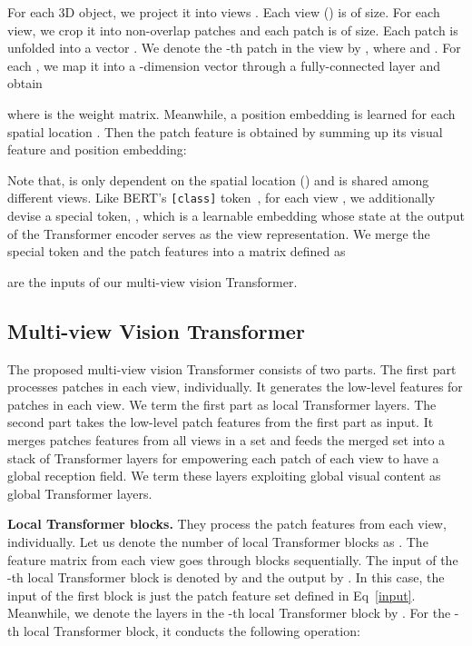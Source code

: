 \documentclass{bmvc2k}
\begin{document}
For each 3D object, we project it into  views . Each view  () is of   size. 
For each view, we crop it into  non-overlap patches and each patch is of  size. Each patch is unfolded into a vector . We denote  the -th patch in the view  by , where  and . 
For each , we map it into a -dimension vector through a fully-connected layer and obtain 

where  is the weight matrix.  Meanwhile,  a position embedding  is learned for each spatial location . Then the patch feature is obtained by summing up its visual feature and position embedding:

Note that,  is only dependent on the spatial location () and is shared among different views.
Like BERT's \texttt{[class]} token~\cite{devlin2019bert}, for each view , we additionally devise a special token, , which is a learnable embedding whose state at the output of the Transformer encoder serves as the view representation. We merge the special token  and  the patch features  into a matrix  defined as 

 are the inputs of our multi-view vision Transformer.

\vspace{-0.1in}
\subsection{Multi-view Vision Transformer}


The proposed multi-view vision Transformer consists of two parts. The first part 
processes patches in each view, individually. It generates the low-level features for patches in each view. We term the first part as local Transformer layers. The second part takes the low-level patch features from the first part as input. It merges patches features from all views in a set and feeds the merged set into a stack of Transformer layers for empowering each patch of each view to have a global reception field. We term these layers exploiting global visual content as global Transformer layers.

\vspace{0.1in}

\noindent \textbf{Local Transformer blocks.} They process the patch features from each view, individually.
Let us denote the number of local Transformer blocks as . The feature matrix  from each view  goes through  blocks sequentially.
The input of the -th local Transformer block is denoted by   and the output by . In this case, the input of the first block  is just the patch feature set  defined in Eq~\eqref{input}. 
Meanwhile, we denote the layers in the -th local Transformer block by . For the -th local Transformer block, it conducts the following operation:
\end{document}
